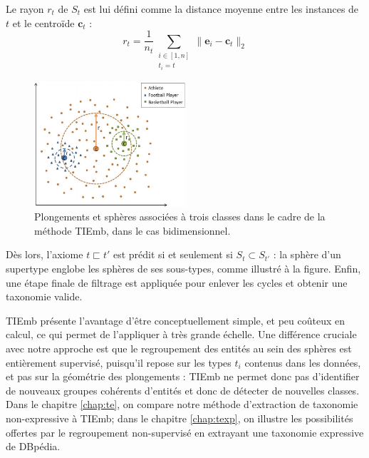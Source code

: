Le rayon $r_t$ de $S_t$ est lui défini comme la distance moyenne entre les instances de $t$ et le centroïde $\textbf{c}_t$ :
\begin{equation}
    r_t = \frac{1}{n_t}  \sum_{\substack{i \in [1, n] \\ t_i = t}} \| \textbf{e}_i - \textbf{c}_t \|_2
\end{equation}


\begin{figure}[h]
    \centering
    \includegraphics[width=0.5\textwidth]{img/tiemb.png}
    \caption[Principe général de TIEmb]{Plongements et sphères associées à trois classes dans le cadre de la méthode TIEmb, dans le cas bidimensionnel.}
    \label{fig:litt-tiemb}
\end{figure}


Dès lors, l'axiome $t \sqsubset t'$ est prédit si et seulement si $S_t \subset S_{t'}$ : la sphère d'un supertype englobe les sphères de ses sous-types, comme illustré à la figure. Enfin, une étape finale de filtrage est appliquée pour enlever les cycles et obtenir une taxonomie valide. 

TIEmb présente l'avantage d'être conceptuellement simple, et peu coûteux en calcul, ce qui permet de l'appliquer à très grande échelle. Une différence cruciale avec notre approche est que le regroupement des entités au sein des sphères est entièrement supervisé, puisqu'il repose sur les types $t_i$ contenus dans les données, et pas sur la géométrie des plongements : TIEmb ne permet donc pas d'identifier de nouveaux groupes cohérents d'entités et donc de détecter de nouvelles classes. Dans le chapitre \ref{chap:te}, on compare notre méthode d'extraction de taxonomie non-expressive à TIEmb; dans le chapitre \ref{chap:texp}, on illustre les possibilités offertes par le regroupement non-supervisé en extrayant une taxonomie expressive de DBpédia.


